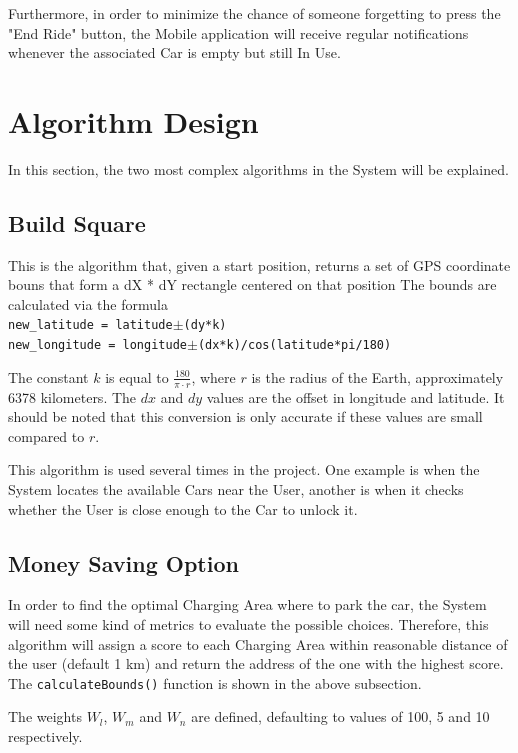 \documentclass[12pt]{article}
\begin{document}
Furthermore, in order to minimize the chance of someone forgetting to press the "End Ride" button, the Mobile application will receive regular notifications whenever the associated Car is empty but still In Use.

\clearpage
\section{Algorithm Design}
In this section, the two most complex algorithms in the System will be explained.
\subsection{Build Square}
This is the algorithm that, given a start position, returns a set of GPS coordinate bouns that form a dX * dY rectangle centered on that position
The bounds are calculated via the formula\\
\verb&new_latitude = latitude&$\pm$\verb&(dy*k)&\\
\verb&new_longitude = longitude&$\pm$\verb&(dx*k)/cos(latitude*pi/180)&

The constant $k$ is equal to $\frac{180}{\pi\cdot r}$, where $r$ is the radius of the Earth, approximately 6378 kilometers. The $dx$ and $dy$ values are the offset in longitude and latitude. It should be noted that this conversion is only accurate if these values are small compared to $r$.

This algorithm is used several times in the project. One example is when the System locates the available Cars near the User, another is when it checks whether the User is close enough to the Car to unlock it.

\subsection{Money Saving Option}
In order to find the optimal Charging Area where to park the car, the System will need some kind of metrics to evaluate the possible choices. Therefore, this algorithm will assign a score to each Charging Area within reasonable distance of the user (default 1 km) and return the address of the one with the highest score. The \verb+calculateBounds()+ function is shown in the above subsection.

The weights $W_l$, $W_m$ and $W_n$ are defined, defaulting to values of 100, 5 and 10 respectively.
\end{document}
